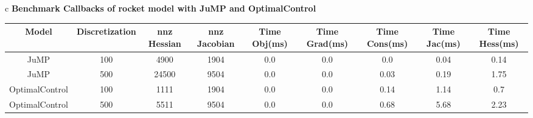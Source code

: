 \documentclass{standalone}
\begin{document}
\begin{tabular}{c}
\Large\textbf{Benchmark Callbacks of rocket model with JuMP and OptimalControl}\\
\begin{tabular}{ccccccccc}
  \hline
  \textbf{Model} & \textbf{Discretization} & \textbf{nnz Hessian} & \textbf{nnz Jacobian} & \textbf{Time Obj(ms)} & \textbf{Time Grad(ms)} & \textbf{Time Cons(ms)} & \textbf{Time Jac(ms)} & \textbf{Time Hess(ms)} \\\hline
  JuMP & 100 & 4900 & 1904 & 0.0 & 0.0 & 0.0 & 0.04 & 0.14 \\
  JuMP & 500 & 24500 & 9504 & 0.0 & 0.0 & 0.03 & 0.19 & 1.75 \\
  OptimalControl & 100 & 1111 & 1904 & 0.0 & 0.0 & 0.14 & 1.14 & 0.7 \\
  OptimalControl & 500 & 5511 & 9504 & 0.0 & 0.0 & 0.68 & 5.68 & 2.23 \\\hline
\end{tabular}
\end{tabular}
\end{document}
